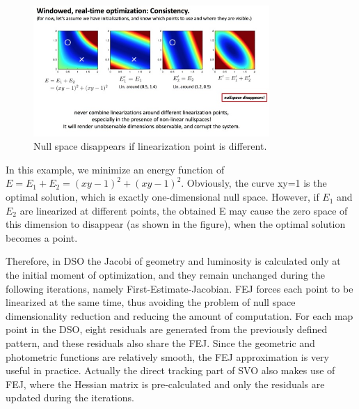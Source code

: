 \documentclass[a4paper,10pt]{article}
\begin{document}
	\begin{figure}[!thp]
		\centering
		\includegraphics[width=0.8\textwidth]{figs/nullspace.jpg}
		\caption{Null space disappears if linearization point is different.}
				\label{fig:nullspace-dso}
	\end{figure}

	In this example, we minimize an energy function of $E=E_1+E_2=(xy-1)^2+(xy-1)^2$. Obviously, the curve xy=1 is the optimal solution, which is exactly one-dimensional null space. However, if $E_1$ and $E_2$ are linearized at different points, the obtained E may cause the zero space of this dimension to disappear (as shown in the figure), when the optimal solution becomes a point.
	
	Therefore, in DSO the Jacobi of geometry and luminosity is calculated only at the initial moment of optimization, and they remain unchanged during the following iterations, namely First-Estimate-Jacobian. FEJ forces each point to be linearized at the same time, thus avoiding the problem of null space dimensionality reduction and reducing the amount of computation. For each map point in the DSO, eight residuals are generated from the previously defined pattern, and these residuals also share the FEJ. Since the geometric and photometric functions are relatively smooth, the FEJ approximation is very useful in practice. Actually the direct tracking part of SVO \cite{forster2014svo} also makes use of FEJ, where the Hessian matrix is pre-calculated and only the residuals are updated during the iterations. 
			
	
	
	
\end{document}
